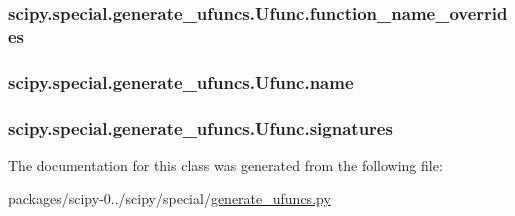 \subsubsection[{function\+\_\+name\+\_\+overrides}]{\setlength{\rightskip}{0pt plus 5cm}scipy.\+special.\+generate\+\_\+ufuncs.\+Ufunc.\+function\+\_\+name\+\_\+overrides}\label{classscipy_1_1special_1_1generate__ufuncs_1_1Ufunc_acefdd895c588c0c28a48e56957e07e55}
\hypertarget{classscipy_1_1special_1_1generate__ufuncs_1_1Ufunc_a8a4840ae88cde0bda4843edaf9b635ff}{}
\subsubsection[{name}]{\setlength{\rightskip}{0pt plus 5cm}scipy.\+special.\+generate\+\_\+ufuncs.\+Ufunc.\+name}\label{classscipy_1_1special_1_1generate__ufuncs_1_1Ufunc_a8a4840ae88cde0bda4843edaf9b635ff}
\hypertarget{classscipy_1_1special_1_1generate__ufuncs_1_1Ufunc_a63d442dedbd8db084909732df2350bae}{}
\subsubsection[{signatures}]{\setlength{\rightskip}{0pt plus 5cm}scipy.\+special.\+generate\+\_\+ufuncs.\+Ufunc.\+signatures}\label{classscipy_1_1special_1_1generate__ufuncs_1_1Ufunc_a63d442dedbd8db084909732df2350bae}


The documentation for this class was generated from the following file\+:\begin{DoxyCompactItemize}
\item 
packages/scipy-\/0../scipy/special/\hyperlink{generate__ufuncs_8py}{generate\+\_\+ufuncs.\+py}\end{DoxyCompactItemize}
